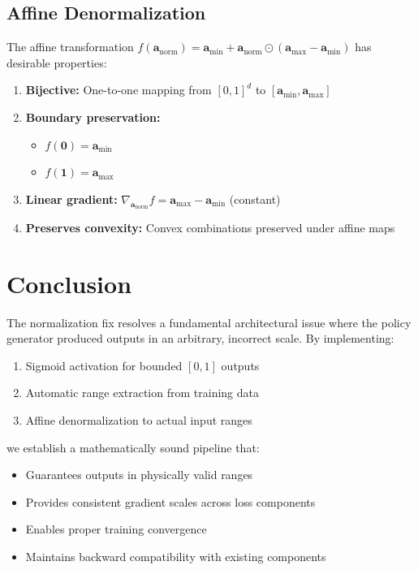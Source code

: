 \documentclass[11pt,a4paper]{article}
\begin{document}
\subsection{Affine Denormalization}

The affine transformation $f(\mathbf{a}_{\text{norm}}) = \mathbf{a}_{\min} + \mathbf{a}_{\text{norm}} \odot (\mathbf{a}_{\max} - \mathbf{a}_{\min})$ has desirable properties:

\begin{enumerate}
    \item \textbf{Bijective:} One-to-one mapping from $[0,1]^d$ to $[\mathbf{a}_{\min}, \mathbf{a}_{\max}]$
    \item \textbf{Boundary preservation:}
    \begin{itemize}
        \item $f(\mathbf{0}) = \mathbf{a}_{\min}$
        \item $f(\mathbf{1}) = \mathbf{a}_{\max}$
    \end{itemize}
    \item \textbf{Linear gradient:} $\nabla_{\mathbf{a}_{\text{norm}}} f = \mathbf{a}_{\max} - \mathbf{a}_{\min}$ (constant)
    \item \textbf{Preserves convexity:} Convex combinations preserved under affine maps
\end{enumerate}

\section{Conclusion}

The normalization fix resolves a fundamental architectural issue where the policy generator produced outputs in an arbitrary, incorrect scale. By implementing:

\begin{enumerate}
    \item Sigmoid activation for bounded $[0, 1]$ outputs
    \item Automatic range extraction from training data
    \item Affine denormalization to actual input ranges
\end{enumerate}

we establish a mathematically sound pipeline that:
\begin{itemize}
    \item Guarantees outputs in physically valid ranges
    \item Provides consistent gradient scales across loss components
    \item Enables proper training convergence
    \item Maintains backward compatibility with existing components
\end{itemize}
\end{document}
